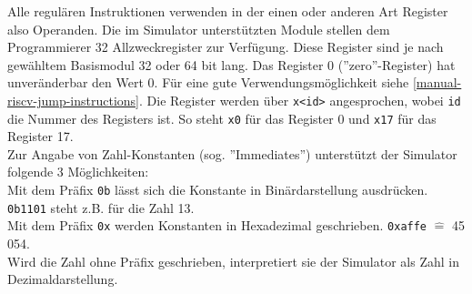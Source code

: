 Alle regulären Instruktionen verwenden in der einen oder anderen Art Register
also Operanden. Die im Simulator unterstützten Module stellen dem Programmierer
32 Allzweckregister zur Verfügung. Diese Register sind je nach gewähltem
Basismodul 32 oder 64 bit lang. Das Register 0 (''zero''-Register) hat
unveränderbar den Wert 0. Für eine gute Verwendungsmöglichkeit siehe
\autoref{manual-riscv-jump-instructions}. Die Register werden über
\texttt{x<id>} angesprochen, wobei \texttt{id} die Nummer des Registers ist. So
steht \texttt{x0} für das Register 0 und \texttt{x17} für das Register 17.\\
Zur Angabe von Zahl-Konstanten (sog. ''Immediates'') unterstützt der Simulator
folgende 3 Möglichkeiten:\\
Mit dem Präfix \texttt{0b} lässt sich die Konstante in Binärdarstellung
ausdrücken. \texttt{0b1101} steht z.B. für die Zahl 13.\\
Mit dem Präfix \texttt{0x} werden Konstanten in Hexadezimal geschrieben.
\texttt{0xaffe} $\widehat{=}$ 45 054.\\
Wird die Zahl ohne Präfix geschrieben, interpretiert sie der Simulator als Zahl
in Dezimaldarstellung.

